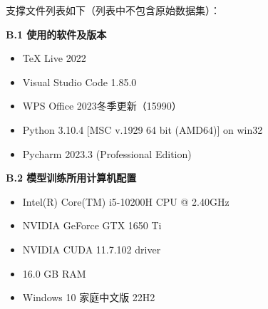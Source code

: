 \documentclass{MathorCupmodeling}
\begin{document}
	支撑文件列表如下（列表中不包含原始数据集）：
	\begin{table}[H]
		\centering
	\end{table}
  
\newpage

	\textbf{B.1 使用的软件及版本}
	\begin{itemize}
		\item TeX Live 2022
		\item Visual Studio Code 1.85.0
		\item WPS Office 2023冬季更新（15990）
		\item Python 3.10.4 [MSC v.1929 64 bit (AMD64)] on win32
		\item Pycharm 2023.3 (Professional Edition)
	\end{itemize}
	
	\textbf{B.2 模型训练所用计算机配置}
	\begin{itemize}
		\item Intel(R) Core(TM) i5-10200H CPU @ 2.40GHz
		\item NVIDIA GeForce GTX 1650 Ti
		\item NVIDIA CUDA 11.7.102 driver
		\item 16.0 GB RAM
		\item Windows 10 家庭中文版 22H2
	\end{itemize}
\end{document}

